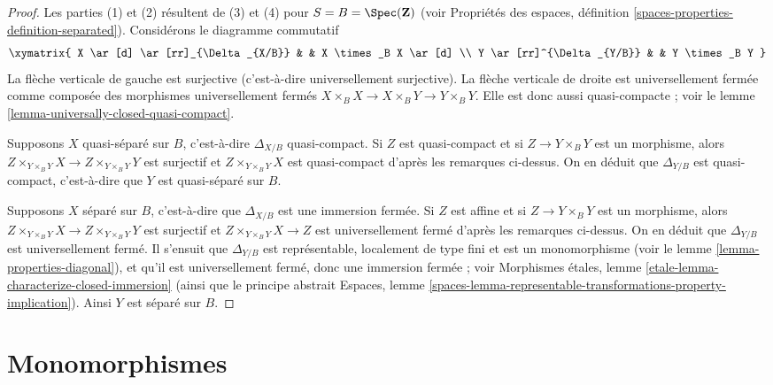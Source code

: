 \begin{proof}
Les parties (1) et (2) résultent de (3) et (4) pour
$S = B = \Spec(\mathbf{Z})$ (voir
Propriétés des espaces,
définition \ref{spaces-properties-definition-separated}).
Considérons le diagramme commutatif
$$
\xymatrix{
X \ar[d] \ar[rr]_{\Delta_{X/B}} & & X \times_B X \ar[d] \\
Y \ar[rr]^{\Delta_{Y/B}} & & Y \times_B Y
}
$$
La flèche verticale de gauche est surjective (c'est-à-dire universellement surjective).
La flèche verticale de droite est universellement fermée comme composée
des morphismes universellement fermés
$X \times_B X \to X \times_B Y \to Y \times_B Y$. Elle est donc aussi
quasi-compacte ; voir le
lemme \ref{lemma-universally-closed-quasi-compact}.

\medskip\noindent
Supposons $X$ quasi-séparé sur $B$, c'est-à-dire  $\Delta_{X/B}$
quasi-compact. Si $Z$ est quasi-compact et si $Z \to Y \times_B Y$ est
un morphisme, alors $Z \times_{Y \times_B Y} X \to Z \times_{Y \times_B Y} Y$
est surjectif et $Z \times_{Y \times_B Y} X$ est quasi-compact d'après les remarques
ci-dessus. On en déduit que $\Delta_{Y/B}$ est quasi-compact, c'est-à-dire que $Y$
est quasi-séparé sur $B$.

\medskip\noindent
Supposons $X$ séparé sur $B$, c'est-à-dire que $\Delta_{X/B}$ est une immersion
fermée. Si $Z$ est affine et si $Z \to Y \times_B Y$ est
un morphisme, alors $Z \times_{Y \times_B Y} X \to Z \times_{Y \times_B Y} Y$
est surjectif et $Z \times_{Y \times_B Y} X \to Z$ est universellement fermé
d'après les remarques ci-dessus. On en déduit que $\Delta_{Y/B}$ est universellement fermé.
Il s'ensuit que $\Delta_{Y/B}$ est représentable, localement de type fini et est un
monomorphisme (voir le
lemme \ref{lemma-properties-diagonal}),
et qu'il est universellement fermé, donc une immersion fermée ; voir
Morphismes \'etales,
lemme \ref{etale-lemma-characterize-closed-immersion}
(ainsi que le principe abstrait
Espaces, lemme
\ref{spaces-lemma-representable-transformations-property-implication}).
Ainsi $Y$ est séparé sur $B$.
\end{proof}













\section{Monomorphismes}
\label{section-monomorphisms}

